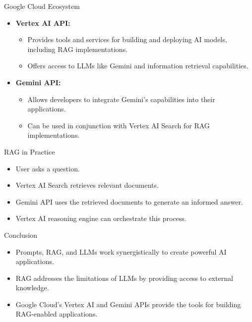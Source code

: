 \begin{frame}{Google Cloud Ecosystem}
    \begin{itemize}
        \item \textbf{Vertex AI API:}
        \begin{itemize}
            \item Provides tools and services for building and deploying AI models, including RAG implementations.
            \item Offers access to LLMs like Gemini and information retrieval capabilities.
        \end{itemize}
        \item \textbf{Gemini API:}
        \begin{itemize}
            \item Allows developers to integrate Gemini's capabilities into their applications.
            \item Can be used in conjunction with Vertex AI Search for RAG implementations.
        \end{itemize}
    \end{itemize}
\end{frame}
%
\begin{frame}{RAG in Practice}
    \begin{itemize}
        \item User asks a question.
        \item Vertex AI Search retrieves relevant documents.
        \item Gemini API uses the retrieved documents to generate an informed answer.
        \item Vertex AI reasoning engine can orchestrate this process.
    \end{itemize}
\end{frame}

\begin{frame}{Conclusion}
  \begin{itemize}
    \item Prompts, RAG, and LLMs work synergistically to create powerful AI applications.
    \item RAG addresses the limitations of LLMs by providing access to external knowledge.
    \item Google Cloud's Vertex AI and Gemini APIs provide the tools for building RAG-enabled applications.
  \end{itemize}
\end{frame}

